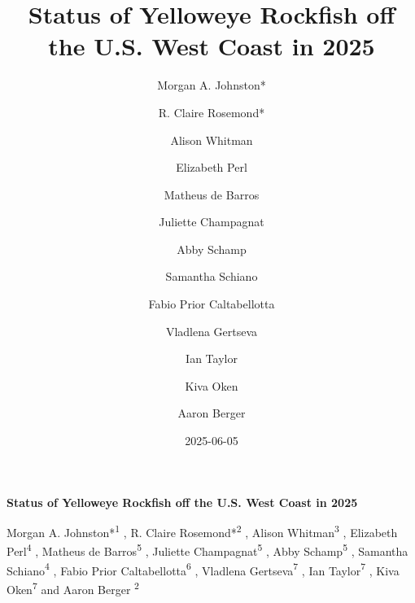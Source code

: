 \documentclass[
]{scrartcl}
\title{Status of Yelloweye Rockfish off the U.S. West Coast in 2025}
\author{Morgan A. Johnston* \and R. Claire Rosemond* \and Alison
Whitman \and Elizabeth Perl \and Matheus de Barros \and Juliette
Champagnat \and Abby Schamp \and Samantha Schiano \and Fabio Prior
Caltabellotta \and Vladlena Gertseva \and Ian Taylor \and Kiva
Oken \and Aaron Berger}
\date{2025-06-05}
\begin{document}
  \begin{titlepage}

  \begin{minipage}[b][\textheight][s]{\textwidth}


  \raggedright




  {\huge\bfseries\nohyphens{Status of Yelloweye Rockfish off the U.S.
  West Coast in 2025}}\\[1\baselineskip]



  \vspace{1\baselineskip}


  \vspace{1\baselineskip}

   {\large{Morgan A. Johnston*}}{\textsuperscript{1}}%
  ,
   {\large{R. Claire Rosemond*}}{\textsuperscript{2}}%
  ,
   {\large{Alison Whitman}}{\textsuperscript{3}}%
  ,
   {\large{Elizabeth Perl}}{\textsuperscript{4}}%
  ,
   {\large{Matheus de Barros}}{\textsuperscript{5}}%
  ,
   {\large{Juliette Champagnat}}{\textsuperscript{5}}%
  ,
   {\large{Abby Schamp}}{\textsuperscript{5}}%
  ,
   {\large{Samantha Schiano}}{\textsuperscript{4}}%
  ,
   {\large{Fabio Prior Caltabellotta}}{\textsuperscript{6}}%
  ,
   {\large{Vladlena Gertseva}}{\textsuperscript{7}}%
  ,
   {\large{Ian Taylor}}{\textsuperscript{7}}%
  ,
   {\large{Kiva Oken}}{\textsuperscript{7}}%
  { and \large{Aaron Berger}}%
  {\textsuperscript{2}}%



\end{minipage}
\end{titlepage}
\end{document}
